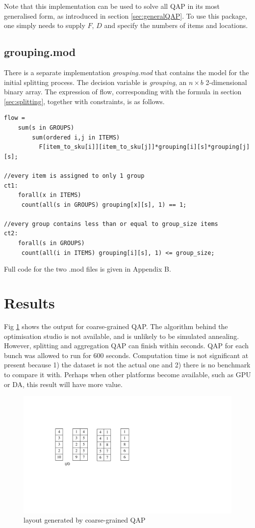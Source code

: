 \documentclass[hyp]{socreport}
\begin{document}
Note that this implementation can be used to solve all QAP in its most generalised form, as introduced in section \ref{sec:generalQAP}. To use this package, one simply needs to supply $F$, $D$ and specify the numbers of items and locations.

\subsection{grouping.mod}
There is a separate implementation \textit{grouping.mod} that contains the model for the initial splitting process. The decision variable is \textit{grouping}, an $n\times b$ 2-dimensional binary array. The expression of flow, corresponding with the formula in section \ref{sec:splitting}, together with constraints, is as follows.
\begin{verbatim}
flow = 
 	sum(s in GROUPS)
 		sum(ordered i,j in ITEMS)
 		  F[item_to_sku[i]][item_to_sku[j]]*grouping[i][s]*grouping[j][s];

//every item is assigned to only 1 group
ct1:
 	forall(x in ITEMS)
 	 count(all(s in GROUPS) grouping[x][s], 1) == 1;
 	 	
//every group contains less than or equal to group_size items
ct2:
 	forall(s in GROUPS)
 	 count(all(i in ITEMS) grouping[i][s], 1) <= group_size;
\end{verbatim}

Full code for the two .mod files is given in Appendix B.

\section{Results}
Fig \ref{fig:coarselayout} shows the output for coarse-grained QAP. The algorithm behind the optimisation studio is not available, and is unlikely to be simulated annealing. However, splitting and aggregation QAP can finish within seconds. QAP for each bunch was allowed to run for 600 seconds. Computation time is not significant at present because 1) the dataset is not the actual one and 2) there is no benchmark to compare it with. Perhaps when other platforms become available, such as GPU or DA, this result will have more value.

\begin{figure}
\includegraphics[scale=0.8]{me}
\centering
\caption{layout generated by coarse-grained QAP}
\label{fig:coarselayout}
\end{figure}
\end{document}
